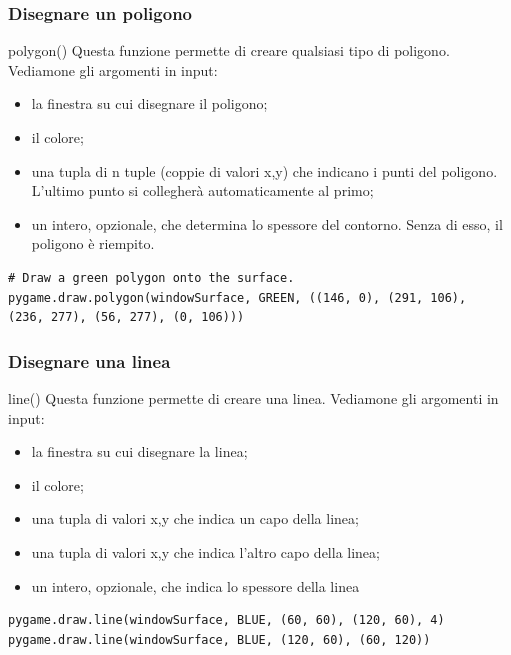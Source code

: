 \documentclass{beamer}
\begin{document}
\begin{frame}[fragile]
\frametitle{Disegnare un poligono}
\begin{block}{polygon()}
	Questa funzione permette di creare qualsiasi tipo di poligono. Vediamone gli argomenti in input:
	\begin{itemize}
		\item la finestra su cui disegnare il poligono;
		\item il colore;
		\item una tupla di n tuple (coppie di valori x,y) che indicano i punti del poligono. L'ultimo punto si collegherà automaticamente al primo;
		\item un intero, opzionale, che determina lo spessore del contorno. Senza di esso, il poligono è riempito.
	\end{itemize}
\end{block}
\begin{lstlisting}
# Draw a green polygon onto the surface.
pygame.draw.polygon(windowSurface, GREEN, ((146, 0), (291, 106),
(236, 277), (56, 277), (0, 106)))
\end{lstlisting}
\end{frame}


\begin{frame}[fragile]
\frametitle{Disegnare una linea}
\begin{block}{line()}
	Questa funzione permette di creare una linea. Vediamone gli argomenti in input:
	\begin{itemize}
		\item la finestra su cui disegnare la linea;
		\item il colore;
		\item una tupla di valori x,y che indica un capo della linea;
		\item una tupla di valori x,y che indica l'altro capo della linea;
		\item un intero, opzionale, che indica lo spessore della linea
	\end{itemize}
\end{block}
\begin{lstlisting}
pygame.draw.line(windowSurface, BLUE, (60, 60), (120, 60), 4)
pygame.draw.line(windowSurface, BLUE, (120, 60), (60, 120))

\end{lstlisting}
\end{frame}
\end{document}
